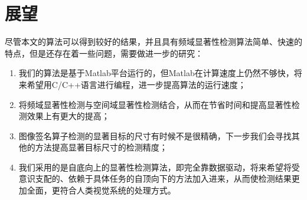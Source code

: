 \section{展望}
\label{5_2}

尽管本文的算法可以得到较好的结果，并且具有频域显著性检测算法简单、快速的特点，但是还存在着一些问题，需要做进一步的研究：
\begin{enumerate}
\item 我们的算法是基于Matlab平台运行的，但Matlab在计算速度上仍然不够快，将来希望用C/C++语言进行编程，进一步提高算法的运行速度；
\item 将频域显著性检测与空间域显著性检测结合，从而在节省时间和提高显著性检测效果上有更大的提高；
\item 图像签名算子检测的显著目标的尺寸有时候不是很精确，下一步我们会寻找其他的方法提高显著目标尺寸的检测精度；
\item 我们采用的是自底向上的显著性检测算法，即完全靠数据驱动，将来希望将受意识支配的、依赖于具体任务的自顶向下的方法加入进来，从而使检测结果更加全面，更符合人类视觉系统的处理方式。
\end{enumerate}












































